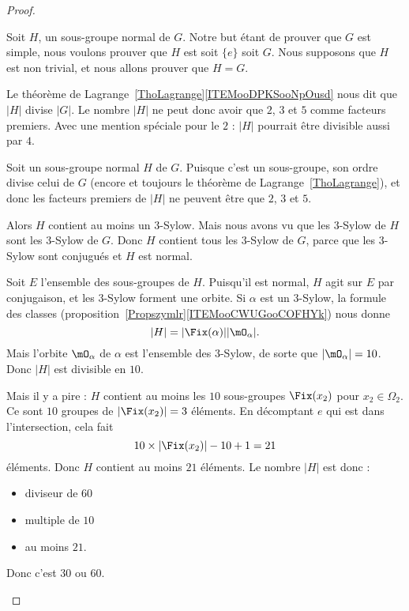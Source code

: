 \begin{proof}
\begin{subproof}
		Soit \( H\), un sous-groupe normal de \( G\). Notre but étant de prouver que \( G\) est simple, nous voulons prouver que \( H\) est soit \( \{ e \}\) soit \( G\). Nous supposons que \( H\) est non trivial, et nous allons prouver que \( H=G\).

		Le théorème de Lagrange~\ref{ThoLagrange}\ref{ITEMooDPKSooNpOusd} nous dit que \( | H |\) divise \( | G |\). Le nombre \( | H |\) ne peut donc avoir que \( 2\), \( 3\) et \( 5\) comme facteurs premiers. Avec une mention spéciale pour le \( 2\) : \( | H |\) pourrait être divisible aussi par \( 4\).

		\spitem[Diviseurs de \( | H |\)]

		Soit un sous-groupe normal \( H\) de \( G\). Puisque c'est un sous-groupe, son ordre divise celui de \( G\) (encore et toujours le théorème de Lagrange~\ref{ThoLagrange}), et donc les facteurs premiers de \( | H |\) ne peuvent être que \( 2\), \( 3\) et \( 5\).

		Alors \( H\) contient au moins un \( 3\)-Sylow. Mais nous avons vu que les \( 3\)-Sylow de \( H\) sont les \( 3\)-Sylow de \( G\). Donc \( H\) contient tous les \( 3\)-Sylow de \( G\), parce que les \( 3\)-Sylow sont conjugués et \( H\) est normal.

		Soit \( E\) l'ensemble des sous-groupes de \( H\). Puisqu'il est normal, \( H\) agit sur \( E\) par conjugaison, et les \( 3\)-Sylow forment une orbite. Si \( \alpha\) est un \( 3\)-Sylow, la formule des classes (proposition~\ref{Propszymlr}\ref{ITEMooCWUGooCOFHYk}) nous donne
		\begin{equation}
			| H |=| \Fix(\alpha) | |\mO_{\alpha} |.
		\end{equation}
		Mais l'orbite \( \mO_{\alpha}\) de \( \alpha\) est l'ensemble des \( 3\)-Sylow, de sorte que \( | \mO_{\alpha} |=10\). Donc \( | H |\) est divisible en \( 10\).

		Mais il y a pire : \( H\) contient au moins les \( 10\) sous-groupes \( \Fix(x_2)\) pour \( x_2\in \Omega_2\). Ce sont \( 10\) groupes de \( | \Fix(x_2) |=3\) éléments. En décomptant \( e\) qui est dans l'intersection, cela fait
		\begin{equation}
			10\times | \Fix(x_2) |-10+1=21
		\end{equation}
		éléments. Donc \( H\) contient au moins \( 21\) éléments. Le nombre \( | H |\) est donc :
		\begin{itemize}
			\item diviseur de \( 60\)
			\item multiple de \( 10\)
			\item au moins \( 21\).
		\end{itemize}
		Donc c'est \( 30\) ou \( 60\).


\end{subproof}
\end{proof}
